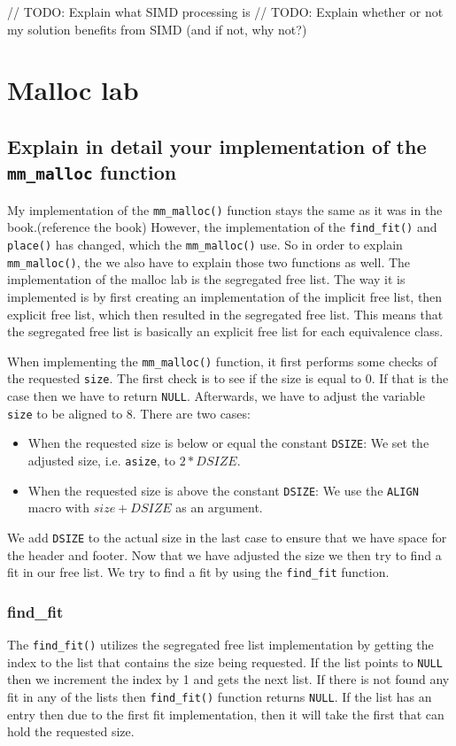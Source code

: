 \documentclass[11pt]{article}
\newcommand{\code}[1]{{\colorbox{lightgray!20}{\color{orange}\texttt{#1}}}}
\newcommand{\temp}[1]{{\color{red}#1}}
\begin{document}
// TODO: Explain what SIMD processing is
// TODO: Explain whether or not my solution benefits from SIMD (and if not, why not?)
\section{Malloc lab}
\subsection{Explain in detail your implementation of the \code{mm\_malloc} function}

My implementation of the \code{mm\_malloc()} function stays the same as it was in the book.\temp{(reference the book)}
However, the implementation of the \code{find\_fit()} and \code{place()} has changed, which the \code{mm\_malloc()} use. So in order to explain \code{mm\_malloc()},
the we also have to explain those two functions as well.
The implementation of the malloc lab is the segregated free list. 
The way it is implemented is by first creating an implementation of the implicit free list, then explicit free list, 
which then resulted in the segregated free list.
This means that the segregated free list is basically an explicit free list for each equivalence class.

When implementing the \code{mm\_malloc()} function, it first performs some checks of the requested \code{size}. The first check is to see if the size is equal to 0. If that is the case then we have to return \code{NULL}.
Afterwards, we have to adjust the variable \code{size} to be aligned to 8. There are two cases:
\begin{itemize}
    \item When the requested size is below or equal the constant \code{DSIZE}: We set the adjusted size, i.e. \code{asize}, to $2 * DSIZE$.
    \item When the requested size is above the constant \code{DSIZE}: We use the \code{ALIGN} macro with $size + DSIZE$ as an argument.
\end{itemize}

We add \code{DSIZE} to the actual size in the last case to ensure that we have space for the header and footer.
Now that we have adjusted the size we then try to find a fit in our free list. 
We try to find a fit by using the \code{find\_fit} function.

\subsubsection{find\_fit}
The \code{find\_fit()} utilizes the segregated free list implementation by getting the index to the list that contains the size being requested. 
If the list points to \code{NULL} then we increment the index by 1 and gets the next list. 
If there is not found any fit in any of the lists then \code{find\_fit()} function returns \code{NULL}.
If the list has an entry then due to the first fit implementation, then it will take the first that can hold the requested size.
\end{document}
